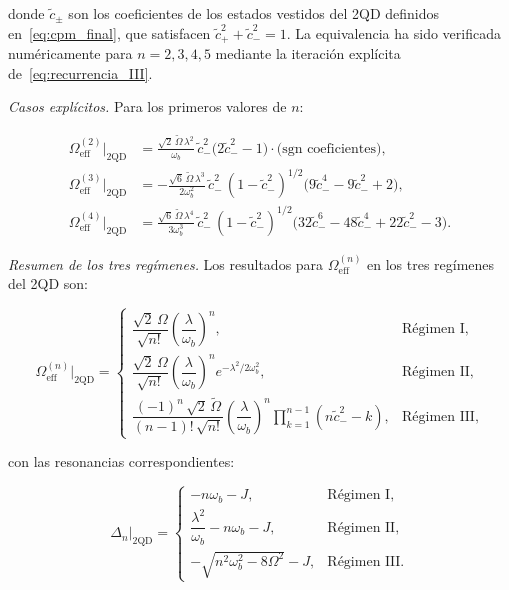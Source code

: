 \documentclass[12pt]{article}
\begin{document}
\noindent
donde $\tilde{c}_\pm$ son los coeficientes de los estados vestidos
del 2QD definidos en~\eqref{eq:cpm_final}, que satisfacen
$\tilde{c}_+^2 + \tilde{c}_-^2 = 1$.
La equivalencia ha sido verificada numéricamente para $n = 2,3,4,5$
mediante la iteración explícita de~\eqref{eq:recurrencia_III}.

\medskip
\noindent
\textit{Casos explícitos.}
Para los primeros valores de $n$:

\begin{align}
	\Omega_\mathrm{eff}^{(2)}\big|_{2\mathrm{QD}}
	&= \frac{\sqrt{2}\,\widetilde\Omega\,\lambda^2}{\omega_b}
	\,\tilde{c}_-^2\bigl(2\tilde{c}_-^2-1\bigr)
	\cdot\bigl(\text{sgn coeficientes}\bigr),
	\label{eq:Oeff2_caso}\\[6pt]
	\Omega_\mathrm{eff}^{(3)}\big|_{2\mathrm{QD}}
	&= -\frac{\sqrt{6}\,\widetilde\Omega\,\lambda^3}{2\omega_b^2}
	\,\tilde{c}_-^2\,(1-\tilde{c}_-^2)^{1/2}
	\bigl(9\tilde{c}_-^4 - 9\tilde{c}_-^2 + 2\bigr),
	\label{eq:Oeff3_caso}\\[6pt]
	\Omega_\mathrm{eff}^{(4)}\big|_{2\mathrm{QD}}
	&= \frac{\sqrt{6}\,\widetilde\Omega\,\lambda^4}{3\omega_b^3}
	\,\tilde{c}_-^2\,(1-\tilde{c}_-^2)^{1/2}
	\bigl(32\tilde{c}_-^6 - 48\tilde{c}_-^4 + 22\tilde{c}_-^2 - 3\bigr).
	\label{eq:Oeff4_caso}
\end{align}

\medskip
\noindent
\textit{Resumen de los tres regímenes.}
Los resultados para $\Omega_\mathrm{eff}^{(n)}$ en los tres regímenes
del 2QD son:

\begin{equation}
	\Omega_\mathrm{eff}^{(n)}\big|_{2\mathrm{QD}} =
	\begin{cases}
		\dfrac{\sqrt{2}\,\Omega}{\sqrt{n!}}
		\left(\dfrac{\lambda}{\omega_b}\right)^n,
		& \text{Régimen I},
		\\[12pt]
		\dfrac{\sqrt{2}\,\Omega}{\sqrt{n!}}
		\left(\dfrac{\lambda}{\omega_b}\right)^n
		e^{-\lambda^2/2\omega_b^2},
		& \text{Régimen II},
		\\[12pt]
		\dfrac{(-1)^n\,\sqrt{2}\,\widetilde\Omega}
		{(n-1)!\,\sqrt{n!}}
		\left(\dfrac{\lambda}{\omega_b}\right)^n
		\displaystyle\prod_{k=1}^{n-1}(n\tilde{c}_-^2-k),
		& \text{Régimen III},
	\end{cases}
	\label{eq:Oeff_resumen}
\end{equation}

\noindent
con las resonancias correspondientes:

\begin{equation}
	\Delta_n\big|_{2\mathrm{QD}} =
	\begin{cases}
		-n\omega_b - J,
		& \text{Régimen I},
		\\[6pt]
		\dfrac{\lambda^2}{\omega_b} - n\omega_b - J,
		& \text{Régimen II},
		\\[8pt]
		-\sqrt{n^2\omega_b^2 - 8\Omega^2} - J,
		& \text{Régimen III}.
	\end{cases}
	\label{eq:Delta_resumen}
\end{equation}
\end{document}
